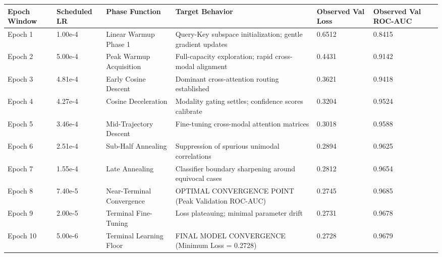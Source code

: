\begin{tabular}{llllll}
\toprule
Epoch Window & Scheduled LR & Phase Function & Target Behavior & Observed Val Loss & Observed Val ROC-AUC \\
\midrule
Epoch 1 & 1.00e-4 & Linear Warmup Phase 1 & Query-Key subspace initialization; gentle gradient updates & 0.6512 & 0.8415 \\
Epoch 2 & 5.00e-4 & Peak Warmup Acquisition & Full-capacity exploration; rapid cross-modal alignment & 0.4431 & 0.9142 \\
Epoch 3 & 4.81e-4 & Early Cosine Descent & Dominant cross-attention routing established & 0.3621 & 0.9418 \\
Epoch 4 & 4.27e-4 & Cosine Deceleration & Modality gating settles; confidence scores calibrate & 0.3204 & 0.9524 \\
Epoch 5 & 3.46e-4 & Mid-Trajectory Descent & Fine-tuning cross-modal attention matrices & 0.3018 & 0.9588 \\
Epoch 6 & 2.51e-4 & Sub-Half Annealing & Suppression of spurious unimodal correlations & 0.2894 & 0.9625 \\
Epoch 7 & 1.55e-4 & Late Annealing & Classifier boundary sharpening around equivocal cases & 0.2812 & 0.9654 \\
Epoch 8 & 7.40e-5 & Near-Terminal Convergence & OPTIMAL CONVERGENCE POINT (Peak Validation ROC-AUC) & 0.2745 & 0.9685 \\
Epoch 9 & 2.00e-5 & Terminal Fine-Tuning & Loss plateauing; minimal parameter drift & 0.2731 & 0.9678 \\
Epoch 10 & 5.00e-6 & Terminal Learning Floor & FINAL MODEL CONVERGENCE (Minimum Loss = 0.2728) & 0.2728 & 0.9679 \\
\bottomrule
\end{tabular}
